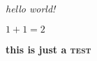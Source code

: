 \documentclass[ngerman]{letter}
\begin{document}
\textit{hello world!}

$1+1=2$

\textbf{this is just a \textsc{test}}
\end{document}
